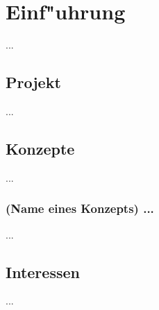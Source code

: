 %
%


\chapter{Einf{"u}hrung}
\label{EF}

...
~\\





\section{Projekt}
\label{EF:Projekt}

...
~\\



\section{Konzepte}
\label{EF:Konzepte}

...
~\\

\subsection{(Name eines Konzepts) ...}

...
~\\





\section{Interessen}
\label{EF:Interessen}

...
~\\











